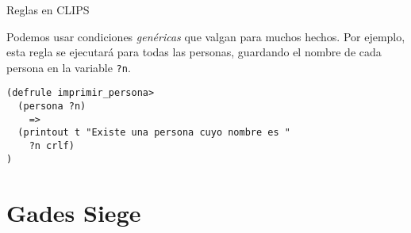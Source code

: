 \documentclass[smaller,spanish,xcolor=svgnames]{beamer}
\begin{document}
\begin{frame}[fragile]{Reglas en CLIPS}

Podemos usar condiciones \textit{genéricas} que valgan para muchos
hechos. Por ejemplo, esta regla se ejecutará para todas las personas, guardando
el nombre de cada persona en la variable \texttt{?n}.

\begin{verbatim}
(defrule imprimir_persona>
  (persona ?n)
    =>
  (printout t "Existe una persona cuyo nombre es " 
    ?n crlf)
)
\end{verbatim}
\end{frame}

\section{Gades Siege}


\end{document}
